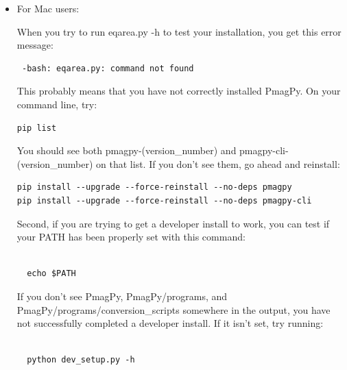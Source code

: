 \documentclass[11pt]{book}
\begin{document}
{{\begin{enumerate}




\begin{itemize}

\item For Mac users:


When you try to run eqarea.py -h to test your installation, you get this error message:

\begin{verbatim} -bash: eqarea.py: command not found
\end{verbatim}

This probably means that you have not correctly installed PmagPy.  On your command line, try:

\begin{verbatim}
pip list
\end{verbatim}

You should see both pmagpy-(version_number) and pmagpy-cli-(version_number) on that list.  If you don't see them, go ahead and reinstall:

\begin{verbatim}
pip install --upgrade --force-reinstall --no-deps pmagpy
pip install --upgrade --force-reinstall --no-deps pmagpy-cli
\end{verbatim}

Second, if you are trying to get a developer install to work, you can test if your PATH has been properly set with this command:\begin{verbatim}

  echo $PATH

\end{verbatim}

If you don't see PmagPy, PmagPy/programs, and PmagPy/programs/conversion_scripts somewhere in the output, you have not successfully completed a developer install.  If it isn't set, try running:\begin{verbatim}

  python dev_setup.py -h


\end{verbatim}
\end{itemize}
\end{enumerate}}}
\end{document}
